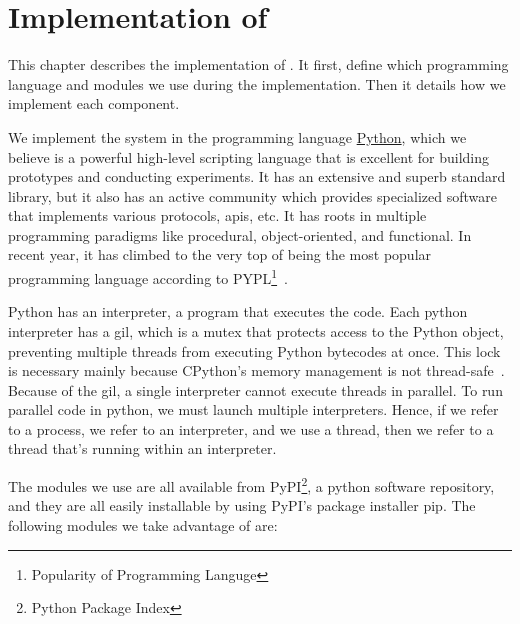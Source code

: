 

\chapter{Implementation of \project}\label{ch:implementation}\glsresetall
This chapter describes the implementation of \project. It first, define which programming language and modules we use during the implementation. Then it details how we implement each component.

We implement the system in the programming language \href{https://www.python.org/}{Python}, which we believe is a powerful high-level scripting language that is excellent for building prototypes and conducting experiments. It has an extensive and superb standard library, but it also has an active community which provides specialized software that implements various protocols, \acp{api}, etc. It has roots in multiple programming paradigms like procedural, object-oriented, and functional. In recent year, it has climbed to the very top of being the most popular programming language according to PYPL\footnote{Popularity of Programming Languge}~\cite{pypl_python}.

Python has an interpreter, a program that executes the code.  Each python interpreter has a \ac{gil}, which is a mutex that protects access to the Python object, preventing multiple threads from executing Python bytecodes at once. This lock is necessary mainly because CPython's memory management is not thread-safe~\cite{python_gil}. Because of the \ac{gil}, a single interpreter cannot execute threads in parallel. To run parallel code in python,  we must launch multiple interpreters. Hence, if we refer to a process, we refer to an interpreter, and we use a thread, then we refer to a thread that's running within an interpreter.

The modules we use are all available from PyPI\footnote{Python Package Index}, a python software repository, and they are all easily installable by using PyPI's package installer pip. The following modules we take advantage of are:

